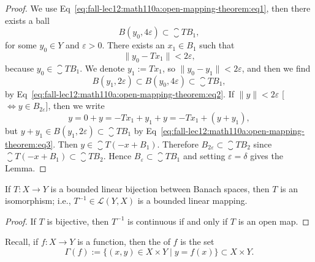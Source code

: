 \begin{proof}
We use Eq~\eqref{eq:fall-lec12:math110a:open-mapping-theorem:eq1},
then there exists a ball
\begin{equation}\label{eq:fall-lec12:math110a:open-mapping-theorem:eq2}
B(y_{0},4\varepsilon)\subset\closure{TB_{1}},
\end{equation}
for some $y_{0}\in Y$ and $\varepsilon>0$. There exists an $x_{1}\in B_{1}$
such that
\begin{equation}
\|y_{0}-Tx_{1}\|<2\varepsilon,
\end{equation}
because $y_{0}\in\closure{TB_{1}}$. We denote $y_{1}:=Tx_{1}$,
so $\|y_{0}-y_{1}\|<2\varepsilon$, and then we find
\begin{equation}\label{eq:fall-lec12:math110a:open-mapping-theorem:eq3}
B(y_{1},2\varepsilon)\subset B(y_{0},4\varepsilon)\subset\closure{TB_{1}},
\end{equation}
by Eq~\eqref{eq:fall-lec12:math110a:open-mapping-theorem:eq2}.
If $\|y\|<2\varepsilon$ [$\iff y\in B_{2\varepsilon}$], then we write
\begin{equation}
y = 0 + y = -Tx_{1} + y_{1} + y = -Tx_{1} + (y + y_{1}),
\end{equation}
but $y+y_{1}\in B(y_{1},2\varepsilon)\subset\closure{TB_{1}}$ by Eq~\eqref{eq:fall-lec12:math110a:open-mapping-theorem:eq3}.
Then $y\in\closure{T(-x+B_{1})}$. Therefore
$B_{2\varepsilon}\subset\closure{TB_{2}}$ since $\closure{T(-x+B_{1})}\subset\closure{TB_{2}}$.
Hence $B_{\varepsilon}\subset\closure{TB_{1}}$ and setting
$\varepsilon=\delta$ gives the Lemma.
\end{proof}

\begin{corollary}
If $T\colon X\to Y$ is a bounded linear bijection between Banach
spaces, then $T$ is an isomorphism; i.e., $T^{-1}\in\mathcal{L}(Y,X)$
is a bounded linear mapping.
\end{corollary}

\begin{proof}
If $T$ is bijective, then $T^{-1}$ is continuous if and only if $T$ is
an open map.
\end{proof}

\begin{node}
Recall, if $f\colon X\to Y$ is a function, then the  of
$f$ is the set
\begin{equation}
\Gamma(f) := \{(x,y)\in X\times Y\mid y=f(x)\}\subset X\times Y.
\end{equation}
\end{node}

